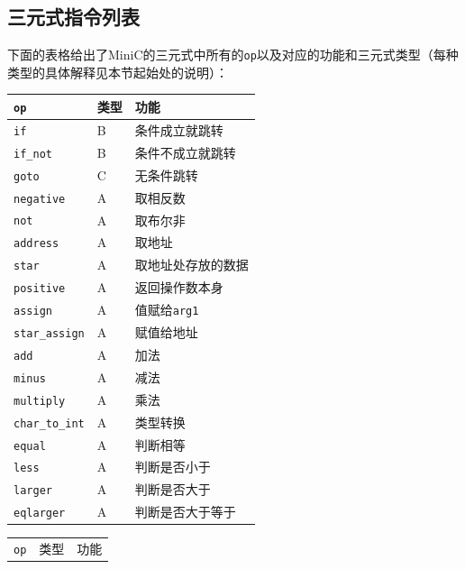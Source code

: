 \subsection{三元式指令列表}
\label{tripleinst}
下面的表格给出了MiniC的三元式中所有的\verb|op|以及对应的功能和三元式类型（每种类型的具体解释见本节起始处的说明）：
\begin{center}
\begin{minipage}{0.48\textwidth}
\begin{flushleft}
	\begin{tabular}{|l|l|l|}
	\hline
		\verb|op| & 类型 & 功能 \\
	\hline
		\verb|if| & B & 条件成立就跳转 \\
	\hline
		\verb|if_not| & B & 条件不成立就跳转 \\
	\hline
		\verb|goto| & C & 无条件跳转\\
	\hline 
		\verb|negative| & A & 取相反数\\
	\hline
		\verb|not| & A & 取布尔非\\
	\hline
		\verb|address| & A & 取地址\\
	\hline
		\verb|star| & A & 取地址处存放的数据\\
	\hline
		\verb|positive| & A & 返回操作数本身\\
	\hline
		\verb|assign| & A & 值赋给\verb|arg1|\\
	\hline
		\verb|star_assign| & A & 赋值给地址\\
	\hline 
		\verb|add| & A & 加法\\
	\hline 
		\verb|minus| & A & 减法\\
	\hline
		\verb|multiply| & A & 乘法\\
	\hline 
		\verb|char_to_int| & A & 类型转换\\
	\hline
		\verb|equal| & A & 判断相等\\
	\hline
		\verb|less| & A & 判断是否小于\\
	\hline 
		\verb|larger| & A & 判断是否大于\\
	\hline
		\verb|eqlarger| & A & 判断是否大于等于\\
	\hline
	\end{tabular} 
\end{flushleft}
\end{minipage}
\begin{minipage}{0.48\textwidth}
\begin{flushright}
\begin{tabular}{|l|l|l|}
	\hline
		\verb|op| & 类型 & 功能 \\

\end{tabular}
\end{flushright}
\end{minipage}
\end{center}
